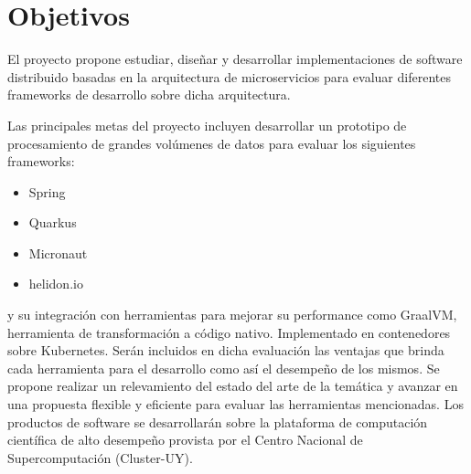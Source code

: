 \section{Objetivos}
El proyecto propone estudiar, diseñar y desarrollar implementaciones de software distribuido basadas en la arquitectura de microservicios para evaluar diferentes frameworks de desarrollo sobre dicha arquitectura.\par

Las principales metas del proyecto incluyen desarrollar un prototipo de procesamiento de grandes volúmenes de datos para evaluar los siguientes frameworks:
\begin{itemize}
    \item{Spring}
    \item{Quarkus}
    \item{Micronaut}
    \item{helidon.io}
\end{itemize}
y su integración con herramientas para mejorar su performance como GraalVM, herramienta de transformación a código nativo. Implementado en contenedores sobre Kubernetes.
Serán incluidos en dicha evaluación las ventajas que brinda cada herramienta para el desarrollo como así el desempeño de los mismos.
Se propone realizar un relevamiento del estado del arte de la temática y avanzar en una propuesta flexible y eficiente para evaluar las herramientas mencionadas.
Los productos de software se desarrollarán sobre la plataforma de computación científica de alto desempeño provista por el Centro Nacional de Supercomputación (Cluster-UY).\par

